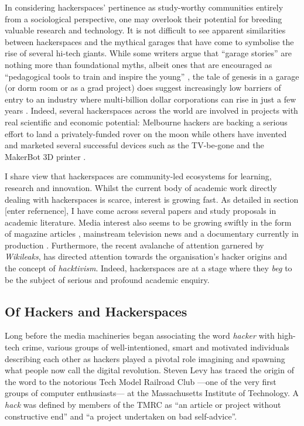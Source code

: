 In considering hackerspaces' pertinence as study-worthy communities entirely from a sociological perspective, one may overlook their potential for breeding valuable research and technology. It is not difficult to see apparent similarities between hackerspaces and the mythical garages that have come to symbolise the rise of several hi-tech giants. While some writers argue that ``garage stories'' are nothing more than foundational myths, albeit ones that are encouraged as ``pedagogical tools to train and inspire the young'' \citep[p.239]{kenney00}, the tale of genesis in a garage (or dorm room or as a grad project) does suggest increasingly low barriers of entry to an industry where multi-billion dollar corporations can rise in just a few years \citep{bahrami00}. Indeed, several hackerspaces across the world are involved in projects with real scientific and economic potential: Melbourne hackers are backing a serious effort to land a privately-funded rover on the moon \citep{connectedcommunity11} while others have invented and marketed several successful devices such as the TV-be-gone \citep{bodzin04} and the MakerBot 3D printer \citep{ginn11}.

I share  view that hackerspaces are community-led ecosystems for learning, research and innovation. Whilst the current body of academic work directly dealing with hackerspaces is scarce, interest is growing fast. As detailed in section [enter refernence], I have come across several papers and study proposals in academic literature. Media interest also seems to be growing swiftly in the form of magazine articles \citep{tweney09,dougherty10}, mainstream television news \citep{ginn11} and a documentary currently in production \citep{bunker11}. Furthermore, the recent avalanche of attention garnered by \textit{Wikileaks}, has directed attention towards the organisation's hacker origins and the concept of \textit{hacktivism}. Indeed, hackerspaces are at a stage where they \emph{beg} to be the subject of serious and profound academic enquiry.



\subsection{Of Hackers and Hackerspaces}

Long before the media machineries began associating the word \textit{hacker} with high-tech crime, various groups of well-intentioned, smart and motivated individuals describing each other as hackers played a pivotal role imagining and spawning what people now call the digital revolution. Steven Levy \citeyearpar{levy84} has traced the origin of the word to the notorious Tech Model Railroad Club ---one of the very first groups of computer enthusiasts--- at the Massachusetts Institute of Technology. A \textit{hack} was defined by members of the TMRC as ``an article or project without constructive end'' and ``a project undertaken on bad self-advice''. 

